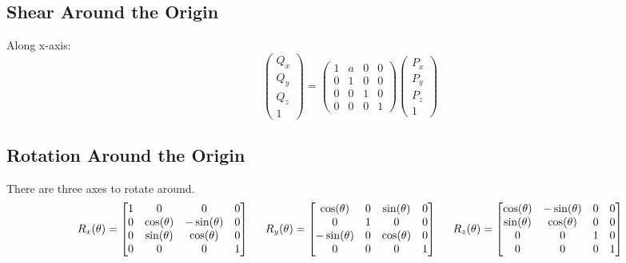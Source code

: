 \documentclass{article}
\begin{document}
\subsection*{Shear Around the Origin}
Along x-axis:
\[\begin{pmatrix}Q_x \\ Q_y \\ Q_z \\ 1\end{pmatrix} = \begin{pmatrix}1 & a & 0 & 0 \\ 0 & 1 & 0 & 0 \\ 0 & 0 & 1 & 0 \\ 0 & 0 & 0 & 1\end{pmatrix}\begin{pmatrix}P_x \\ P_y \\ P_z \\ 1\end{pmatrix}\]

\subsection*{Rotation Around the Origin}
There are three axes to rotate around.
\begin{align*}
R_x(\theta) = \begin{bmatrix} 1 & 0 & 0 & 0 \\ 0 & \cos(\theta) & -\sin(\theta) & 0 \\ 0 & \sin(\theta) & \cos(\theta) & 0 \\ 0 & 0 & 0 & 1 \end{bmatrix}
\hspace{0.5cm}
R_y(\theta) = \begin{bmatrix} \cos(\theta) & 0 & \sin(\theta) & 0 \\ 0 & 1 & 0 & 0 \\ -\sin(\theta) & 0 & \cos(\theta) & 0 \\ 0 & 0 & 0 & 1 \end{bmatrix}
\hspace{0.5cm}
R_z(\theta) = \begin{bmatrix} \cos(\theta) & -\sin(\theta) & 0 & 0 \\ \sin(\theta) & \cos(\theta) & 0 & 0 \\ 0 & 0 & 1 & 0 \\ 0 & 0 & 0 & 1 \end{bmatrix}
\end{align*}
\end{document}
